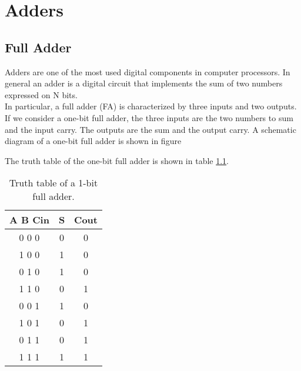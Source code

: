 \chapter{Adders}
\label{chap1}



\section{Full Adder}

Adders are one of the most used digital components in computer processors. In general an adder is a digital circuit that implements the sum of two numbers expressed on N bits.\\
In particular, a full adder (FA) is characterized by three inputs and two outputs. If we consider a one-bit full adder, the three inputs are the two numbers to sum and the input carry. The outputs are the sum and the output carry. A schematic diagram of a one-bit full adder is shown in figure

The truth table of the one-bit full adder is shown in table \ref{tab:1}. %


	\begin{table}[ht]
	\centering
	\begin{tabular}{ccc}
	\toprule
	A B Cin & S & Cout\\
	\midrule
	0 0 0 & 0 & 0\\
	1 0 0 & 1 & 0\\
	0 1 0 & 1 & 0\\
	1 1 0 & 0 & 1\\
	0 0 1 & 1 & 0\\
	1 0 1 & 0 & 1\\
	0 1 1 & 0 & 1\\
	1 1 1 & 1 & 1\\
	\bottomrule
	\end{tabular}
	\caption{Truth table of a 1-bit full adder.}
	\label{tab:1} %
	\end{table}
	
